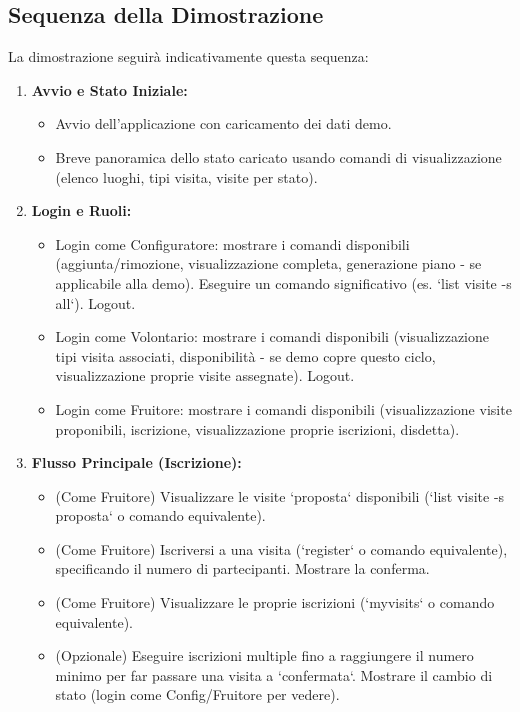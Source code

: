 \documentclass[a4paper,12pt]{article}
\begin{document}
\subsection{Sequenza della Dimostrazione}
La dimostrazione seguirà indicativamente questa sequenza:
\begin{enumerate}
    \item \textbf{Avvio e Stato Iniziale:}
        \begin{itemize}
            \item Avvio dell'applicazione con caricamento dei dati demo.
            \item Breve panoramica dello stato caricato usando comandi di visualizzazione (elenco luoghi, tipi visita, visite per stato).
        \end{itemize}
    \item \textbf{Login e Ruoli:}
        \begin{itemize}
            \item Login come Configuratore: mostrare i comandi disponibili (aggiunta/rimozione, visualizzazione completa, generazione piano - se applicabile alla demo). Eseguire un comando significativo (es. `list visite -s all`). Logout.
            \item Login come Volontario: mostrare i comandi disponibili (visualizzazione tipi visita associati, disponibilità - se demo copre questo ciclo, visualizzazione proprie visite assegnate). Logout.
            \item Login come Fruitore: mostrare i comandi disponibili (visualizzazione visite proponibili, iscrizione, visualizzazione proprie iscrizioni, disdetta).
        \end{itemize}
    \item \textbf{Flusso Principale (Iscrizione):}
        \begin{itemize}
            \item (Come Fruitore) Visualizzare le visite `proposta` disponibili (`list visite -s proposta` o comando equivalente).
            \item (Come Fruitore) Iscriversi a una visita (`register` o comando equivalente), specificando il numero di partecipanti. Mostrare la conferma.
            \item (Come Fruitore) Visualizzare le proprie iscrizioni (`myvisits` o comando equivalente).
            \item (Opzionale) Eseguire iscrizioni multiple fino a raggiungere il numero minimo per far passare una visita a `confermata`. Mostrare il cambio di stato (login come Config/Fruitore per vedere).

\end{itemize}
\end{enumerate}
\end{document}

